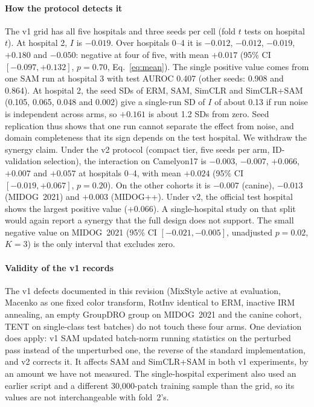\paragraph{How the protocol detects it} The v1 grid has all five hospitals and
three seeds per cell (fold $t$ tests on hospital $t$). At hospital 2, $I$ is
$-0.019$. Over hospitals 0--4 it is $-0.012$, $-0.012$, $-0.019$, $+0.180$ and
$-0.050$: negative at four of five, with mean $+0.017$ (95\% CI
$[-0.097,+0.132]$, $p=0.70$, Eq.~\ref{eq:mean}). The single positive value
comes from one SAM run at hospital 3 with test AUROC 0.407 (other seeds:
0.908 and 0.864). At hospital 2, the seed SDs of ERM, SAM,
SimCLR and SimCLR+SAM (0.105, 0.065, 0.048 and 0.002) give a single-run SD of $I$ of about 0.13
if run noise is independent across arms, so $+0.161$ is about 1.2 SDs from
zero. Seed replication thus shows that one run cannot separate the effect from
noise, and domain completeness that its sign depends on the test hospital.
We withdraw the synergy claim. Under the v2 protocol (compact tier, five
seeds per arm, ID-validation selection), the interaction on Camelyon17 is
$-0.003$, $-0.007$, $+0.066$, $+0.007$ and $+0.057$ at hospitals 0--4, with
mean $+0.024$ (95\% CI $[-0.019,+0.067]$, $p=0.20$). On the other cohorts it is
$-0.007$ (canine), $-0.013$ (MIDOG~2021) and $+0.003$ (MIDOG++). Under v2, the
official test hospital shows the largest positive value ($+0.066$). A
single-hospital study on that split would again report a synergy that the full
design does not support. The small negative value on MIDOG~2021 (95\% CI
$[-0.021,-0.005]$, unadjusted $p=0.02$, $K=3$) is the only interval that
excludes zero.

\paragraph{Validity of the v1 records} The v1 defects documented in this
revision (MixStyle active at evaluation, Macenko as one fixed color transform,
RotInv identical to ERM, inactive IRM annealing, an empty GroupDRO group on
MIDOG~2021 and the canine cohort, TENT on single-class test batches) do not
touch these four arms. One deviation does apply: v1 SAM updated batch-norm running statistics on the
perturbed pass instead of the unperturbed one, the reverse of the standard
implementation, and v2 corrects it. It affects SAM and SimCLR+SAM in both
v1 experiments, by an amount we have not measured. The single-hospital
experiment also used an earlier script and a different 30,000-patch training
sample than the grid, so its values are not interchangeable with fold~2's.

